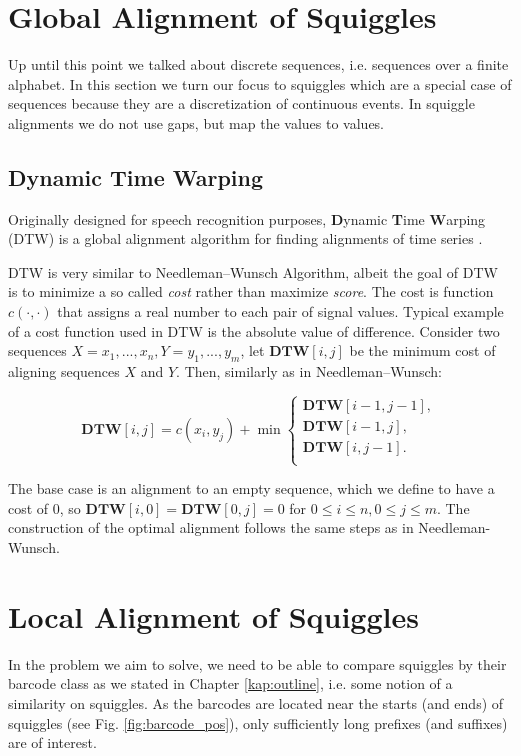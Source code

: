 \section{Global Alignment of Squiggles}
Up until this point we talked about discrete sequences, i.e. sequences over a finite alphabet. In this section we turn our focus to squiggles which are a special case of sequences because they are a discretization of continuous events. In squiggle alignments we do not use gaps, but map the values to values.

\subsection{Dynamic Time Warping}
Originally designed for speech recognition purposes, \textbf{D}ynamic \textbf{T}ime \textbf{W}arping (DTW) is a global alignment algorithm for finding alignments of time series \cite{kruskal1983overview}.

DTW is very similar to Needleman–Wunsch Algorithm, albeit the goal of DTW is to minimize a so called \textit{cost} rather than maximize \textit{score}. The cost is function $c(\cdot, \cdot)$ that assigns a real number to each pair of signal values. Typical example of a cost function used in DTW is the absolute value of difference. Consider two sequences $X = x_1,...,x_n, Y = y_1,...,y_m$, let $\textbf{DTW}[i, j]$ be the minimum cost of aligning sequences $X$ and $Y$. Then, similarly as in Needleman–Wunsch:

\begin{equation}
\textbf{DTW}[i, j] = c(x_i, y_j) + \min
        \begin{cases}
            \textbf{DTW}[i - 1, j - 1],\\
            \textbf{DTW}[i - 1, j],\\
            \textbf{DTW}[i, j - 1].\\
        \end{cases}
    \label{eq:dtw_recurrence}
\end{equation}

The base case is an alignment to an empty sequence, which we define to have a cost of $0$, so $\textbf{DTW}[i, 0] = \textbf{DTW}[0, j] = 0$ for $0 \leq i \leq n, 0 \leq j \leq m$. The construction of the optimal alignment follows the same steps as in Needleman-Wunsch.

\section{Local Alignment of Squiggles}
In the problem we aim to solve, we need to be able to compare squiggles by their barcode class as we stated in Chapter \ref{kap:outline}, i.e. some notion of a similarity on squiggles. As the barcodes are located near the starts (and ends) of squiggles (see Fig. \ref{fig:barcode_pos}), only sufficiently long prefixes (and suffixes) are of interest.

